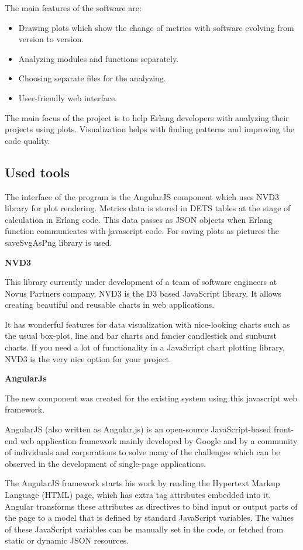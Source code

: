 The main features of the software are:
\begin{itemize}
	\item Drawing plots which show the change of metrics with software evolving from version to version.
	\item Analyzing modules and functions separately.
	\item Choosing separate files for the analyzing.
	\item User-friendly web interface.
\end{itemize}

The main focus of the project is to help Erlang developers with analyzing their projects using plots. Visualization helps with finding patterns and improving the code quality. 

\subsection{Used tools}

The interface of the program is the AngularJS component which uses NVD3 library for plot rendering. Metrics data is stored in DETS tables at the stage of calculation in Erlang code. This data passes as JSON objects when Erlang function communicates with javascript code. For saving plots as pictures the saveSvgAsPng library is used.

\textbf{NVD3}

This library currently under development of a team of software engineers at Novus Partners company. NVD3 is the D3 based JavaScript library. It allows creating beautiful and reusable charts in web applications.

It has wonderful features for data visualization with nice-looking charts such as the usual box-plot, line and bar charts and fancier candlestick and sunburst charts. If you need a lot of functionality in a JavaScript chart plotting library, NVD3 is the very nice option for your project.

\textbf{AngularJs}

The new component was created for the existing system using this javascript web framework.

AngularJS (also written as Angular.js) is an open-source JavaScript-based front-end web application framework mainly developed by Google and by a community of individuals and corporations to solve many of the challenges which can be observed in the development of single-page applications.

The AngularJS framework starts his work by reading the Hypertext Markup Language (HTML) page, which has extra tag attributes embedded into it. Angular transforms these attributes as directives to bind input or output parts of the page to a model that is defined by standard JavaScript variables. The values of these JavaScript variables can be manually set in the code, or fetched from static or dynamic JSON resources. 


